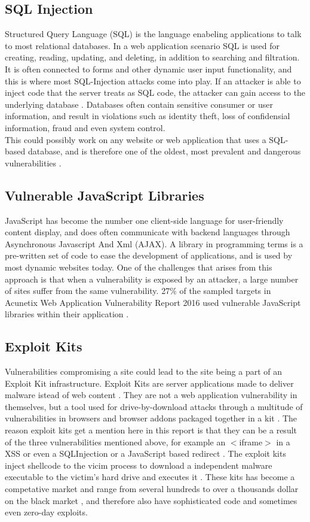 \subsection{SQL Injection}
Structured Query Language (SQL) is the language enabeling applications to talk to most relational databases. In a web application scenario SQL is used for creating, reading, updating, and deleting, in addition to searching and filtration. It is often connected to forms and other dynamic user input functionality, and this is where most SQL-Injection attacks come into play. If an attacker is able to inject code that the server treats as SQL code, the attacker can gain access to the underlying database \cite{Bisson2005}. Databases often contain sensitive consumer or user information, and result in violations such as identity theft, loss of confidensial information, fraud and even system control.
\\ This could possibly work on any website or web application that uses a SQL-based database, and is therefore one of the oldest, most prevalent and dangerous vulnerabilities \cite{Acunetix2016}.
\subsection{Vulnerable JavaScript Libraries}
JavaScript has become the number one client-side language for user-friendly content display, and does often communicate with backend languages through Asynchronous Javascript And Xml (AJAX). A library in programming terms is a pre-written set of code to ease the development of applications, and is used by most dynamic websites today. One of the challenges that arises from this approach is that when a vulnerability is exposed by an attacker, a large number of sites suffer from the same vulnerability.
27\% of the sampled targets in Acunetix Web Application Vulnerability Report 2016 used vulnerable JavaScript libraries within their application \cite{Acunetix2016}. 
\subsection{Exploit Kits}
Vulnerabilities compromising a site could lead to the site being a part of an Exploit Kit infrastructure. Exploit Kits are server applications made to deliver malware istead of web content \cite{Preuss2011}. They are not a web application vulnerability in themselves, but a tool used for drive-by-download attacks through a multitude of vulnerabilities in browsers and browser addons packaged together in a kit \cite{Kotov2013}. The reason exploit kits get a mention here in this report is that they can be a result of the three vulnerabilities mentioned above, for example an $<$iframe$>$ in a XSS or even a SQLInjection or a JavaScript based redirect \cite{Preuss2011}.
The exploit kits inject shellcode to the vicim process to download a independent malware executable to the victim's hard drive and executes it \cite{Preuss2011}.
These kits has become a competative market and range from several hundreds to over a thousands dollar on the black market \cite{Preuss2011}, and therefore also have sophisticated code and sometimes even zero-day exploits.
\pagebreak
